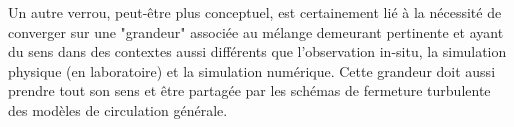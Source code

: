 Un autre verrou, peut-être plus conceptuel, est certainement lié à la nécessité de converger sur une "grandeur" associée au mélange demeurant pertinente et ayant du sens dans des contextes aussi différents que l'observation in-situ, la simulation physique (en laboratoire) et la simulation numérique. Cette grandeur doit aussi prendre tout son sens et être partagée par les schémas de fermeture turbulente des modèles de circulation générale.







